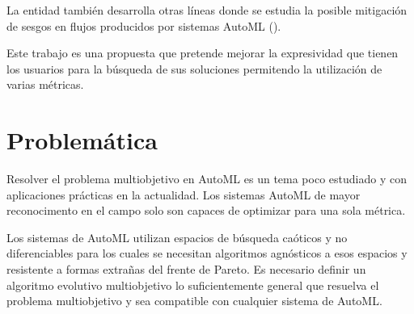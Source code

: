 La entidad tambi\'en desarrolla otras l\'ineas donde se estudia la posible mitigaci\'on de sesgos en flujos producidos por sistemas AutoML (\cite{consuegra2022intelligent}).

Este trabajo es una propuesta que pretende mejorar la expresividad que tienen los usuarios para la b\'usqueda de sus soluciones permitendo la utilizaci\'on de varias m\'etricas.

\section*{Problem\'atica}
Resolver el problema multiobjetivo en AutoML es un tema poco estudiado y con aplicaciones pr\'acticas en la actualidad.
Los sistemas AutoML de mayor reconocimento en el campo solo son capaces de optimizar para una sola m\'etrica. 

Los sistemas de AutoML utilizan espacios de b\'usqueda ca\'oticos y no diferenciables para los cuales se necesitan algoritmos agn\'osticos a esos espacios y resistente a formas extra\~nas del frente de Pareto. Es necesario definir un algoritmo evolutivo multiobjetivo lo suficientemente general que resuelva el problema multiobjetivo y sea compatible con cualquier sistema de AutoML.




